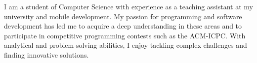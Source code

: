 
    I am a student of Computer Science with experience as a teaching assistant at my university and mobile development. 
    My passion for programming and software development has led me to acquire a deep understanding in these areas 
    and to participate in competitive programming contests such as the ACM-ICPC. With analytical and problem-solving abilities, 
    I enjoy tackling complex challenges and finding innovative solutions.

